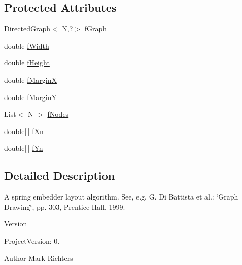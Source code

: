 \subsection*{Protected Attributes}
\begin{DoxyCompactItemize}
\item 
Directed\-Graph$<$ N,?$>$ \hyperlink{classorg_1_1tzi_1_1use_1_1gui_1_1graphlayout_1_1_spring_layout_3_01_n_01extends_01_layoutable_01_4_af96110b36aa996c03972d378ac1a3607}{f\-Graph}
\item 
double \hyperlink{classorg_1_1tzi_1_1use_1_1gui_1_1graphlayout_1_1_spring_layout_3_01_n_01extends_01_layoutable_01_4_a32ef07ad497d7300fa8183856a2c59bc}{f\-Width}
\item 
double \hyperlink{classorg_1_1tzi_1_1use_1_1gui_1_1graphlayout_1_1_spring_layout_3_01_n_01extends_01_layoutable_01_4_a9008e461e113a5b2b4f883483af729a4}{f\-Height}
\item 
double \hyperlink{classorg_1_1tzi_1_1use_1_1gui_1_1graphlayout_1_1_spring_layout_3_01_n_01extends_01_layoutable_01_4_a1e71645e14e3e6724852dbbb0880cefe}{f\-Margin\-X}
\item 
double \hyperlink{classorg_1_1tzi_1_1use_1_1gui_1_1graphlayout_1_1_spring_layout_3_01_n_01extends_01_layoutable_01_4_a890283b5abcc1df079dd0d7181f95433}{f\-Margin\-Y}
\item 
List$<$ N $>$ \hyperlink{classorg_1_1tzi_1_1use_1_1gui_1_1graphlayout_1_1_spring_layout_3_01_n_01extends_01_layoutable_01_4_a67c950738242a1d3f023750a420c8cd6}{f\-Nodes}
\item 
double\mbox{[}$\,$\mbox{]} \hyperlink{classorg_1_1tzi_1_1use_1_1gui_1_1graphlayout_1_1_spring_layout_3_01_n_01extends_01_layoutable_01_4_abbdd2c67458dbf95062c23d202ef8734}{f\-Xn}
\item 
double\mbox{[}$\,$\mbox{]} \hyperlink{classorg_1_1tzi_1_1use_1_1gui_1_1graphlayout_1_1_spring_layout_3_01_n_01extends_01_layoutable_01_4_a482259a39063805d020e284b6463bf6e}{f\-Yn}
\end{DoxyCompactItemize}


\subsection{Detailed Description}
A spring embedder layout algorithm. See, e.\-g. G. Di Battista et al.\-: \char`\"{}\-Graph Drawing\char`\"{}, pp. 303, Prentice Hall, 1999.

\begin{DoxyVersion}{Version}

\end{DoxyVersion}
\begin{DoxyParagraph}{Project\-Version\-:}
0. 
\end{DoxyParagraph}
\begin{DoxyAuthor}{Author}
Mark Richters 
\end{DoxyAuthor}


